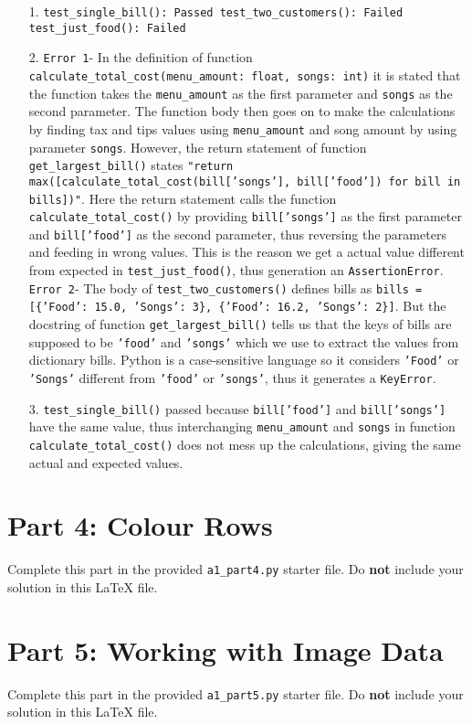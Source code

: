 \documentclass[12pt]{article}
\begin{document}
\begin{enumerate}
\item[1.]
\texttt{test\_single\_bill(): Passed \newline
test\_two\_customers(): Failed \newline
test\_just\_food(): Failed}

\item[2.]
\texttt{Error 1}- In the definition of function \texttt{calculate\_total\_cost(menu\_amount: float, songs: int)} it is stated that the function takes the \texttt{menu\_amount} as the first parameter and \texttt{songs} as the second parameter. The function body then goes on to make the calculations by finding tax and tips values using \texttt{menu\_amount} and song amount by using parameter \texttt{songs}. However, the return statement of function \texttt{get\_largest\_bill()} states \newline \texttt{"return max([calculate\_total\_cost(bill['songs'], bill['food']) for bill in bills])"}. Here the return statement calls the function \texttt{calculate\_total\_cost()} by providing \texttt{bill['songs']} as the first parameter and \texttt{bill['food']} as the second parameter, thus reversing the parameters and feeding in wrong values. This is the reason we get a actual value different from expected in \texttt{test\_just\_food()}, thus generation an \texttt{AssertionError}. \newline \newline
\texttt{Error 2}- The body of \texttt{test\_two\_customers()} defines bills as \texttt{bills = [\{'Food': 15.0, 'Songs': 3\}, \{'Food': 16.2, 'Songs': 2\}]}. But the docstring of function \newline \texttt{get\_largest\_bill()} tells us that the keys of bills are supposed to be \texttt{'food'} and \texttt{'songs'} which we use to extract the values from dictionary bills. Python is a case-sensitive language so it considers \texttt{'Food'} or \texttt{'Songs'} different from \texttt{'food'} or \texttt{'songs'}, thus it generates a \texttt{KeyError}.

\item[3.]
\texttt{test\_single\_bill()} passed because \texttt{bill['food']} and \texttt{bill['songs']} have the same value, thus interchanging \texttt{menu\_amount} and \texttt{songs} in function \texttt{calculate\_total\_cost()} does not mess up the calculations, giving the same actual and expected values.
\end{enumerate}

\section*{Part 4: Colour Rows}

Complete this part in the provided \texttt{a1\_part4.py} starter file.
Do \textbf{not} include your solution in this LaTeX file.

\section*{Part 5: Working with Image Data}

Complete this part in the provided \texttt{a1\_part5.py} starter file.
Do \textbf{not} include your solution in this LaTeX file.
\end{document}
